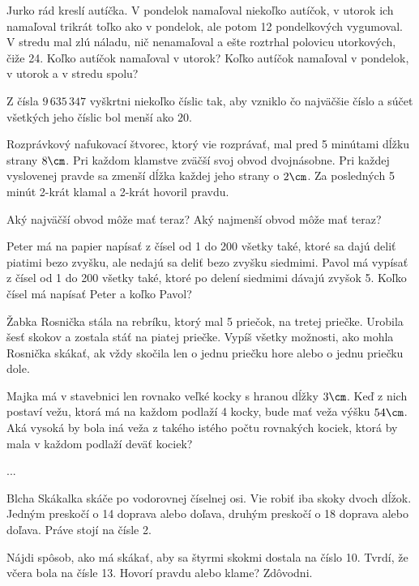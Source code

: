 ﻿{%
Jurko rád kreslí autíčka. V pondelok namaľoval niekoľko autíčok, v utorok ich namaľoval
trikrát toľko ako v pondelok, ale potom 12 pondelkových vygumoval. V stredu mal zlú
náladu, nič nenamaľoval a ešte roztrhal polovicu utorkových, čiže 24. Koľko autíčok
namaľoval v utorok? Koľko autíčok namaľoval v pondelok, v utorok a v stredu spolu?}

{%
Z čísla $9\,635\,347$ vyškrtni niekoľko číslic tak, aby vzniklo čo najväčšie číslo a súčet všetkých
jeho číslic bol menší ako $20$.}

{%
Rozprávkový nafukovací štvorec, ktorý vie rozprávať, mal pred 5 minútami dĺžku strany $8\cm$.
Pri každom klamstve zväčší svoj obvod dvojnásobne. Pri každej vyslovenej pravde sa zmenší
dĺžka každej jeho strany o $2\cm$. Za posledných 5 minút 2-krát klamal a 2-krát hovoril pravdu.
\begin{itemize}
 Aký najväčší obvod môže mať teraz?
 Aký najmenší obvod môže mať teraz?
\end{itemize}
}

{%
Peter má na papier napísať z čísel od 1 do 200 všetky také, ktoré sa dajú deliť piatimi bezo
zvyšku, ale nedajú sa deliť bezo zvyšku siedmimi. Pavol má vypísať z čísel od 1 do 200
všetky také, ktoré po delení siedmimi dávajú zvyšok 5. Koľko čísel má napísať Peter a koľko
Pavol?}

{%
Žabka Rosnička stála na rebríku, ktorý mal 5 priečok, na tretej priečke. Urobila šesť skokov
a zostala stáť na piatej priečke. Vypíš všetky možnosti, ako mohla Rosnička skákať, ak vždy
skočila len o jednu priečku hore alebo o jednu priečku dole.}

{%
Majka má v stavebnici len rovnako veľké kocky s hranou dĺžky $3\cm$. Keď z nich postaví
vežu, ktorá má na každom podlaží 4 kocky, bude mať veža výšku $54\cm$. Aká vysoká by bola
iná veža z takého istého počtu rovnakých kociek, ktorá by mala v každom podlaží deväť
kociek?}

{%
...}

{%
Blcha Skákalka skáče po vodorovnej číselnej osi. Vie robiť iba skoky dvoch dĺžok. Jedným
preskočí o 14 doprava alebo doľava, druhým preskočí o 18 doprava alebo doľava. Práve stojí
na čísle 2.
\begin{itemize}
 Nájdi spôsob, ako má skákať, aby sa štyrmi skokmi dostala na číslo 10.
 Tvrdí, že včera bola na čísle 13. Hovorí pravdu alebo klame? Zdôvodni.
\end{itemize}
}

